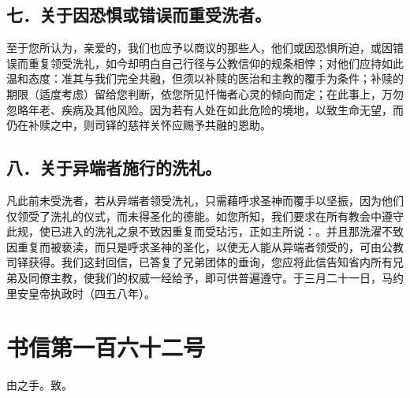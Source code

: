 
\subsection{七．关于因恐惧或错误而重受洗者。}

至于您所认为，亲爱的，我们也应予以商议的那些人，他们或因恐惧所迫，或因错误而重复领受洗礼，如今却明白自己行径与公教信仰的规条相悖；对他们应持如此温和态度：准其与我们完全共融，但须以补赎的医治和主教的覆手为条件；补赎的期限（适度考虑）留给您判断，依您所见忏悔者心灵的倾向而定；在此事上，万勿忽略年老、疾病及其他风险。因为若有人处在如此危险的境地，以致生命无望，而仍在补赎之中，则司铎的慈祥关怀应赐予共融的恩助。\par


\subsection{八．关于异端者施行的洗礼。}

凡此前未受洗者，若从异端者领受洗礼，只需藉呼求圣神而覆手以坚振，因为他们仅领受了洗礼的仪式，而未得圣化的德能。如您所知，我们要求在所有教会中遵守此规，使已进入的洗礼之泉不致因重复而受玷污，正如主所说：。并且那洗濯不致因重复而被亵渎，而只是呼求圣神的圣化，以使无人能从异端者领受的，可由公教司铎获得。我们这封回信，已答复了兄弟团体的垂询，您应将此信告知省内所有兄弟及同僚主教，使我们的权威一经给予，即可供普遍遵守。于三月二十一日，马约里安皇帝执政时（四五八年）。\par



\section{书信第一百六十二号}

由之手。致。\par

